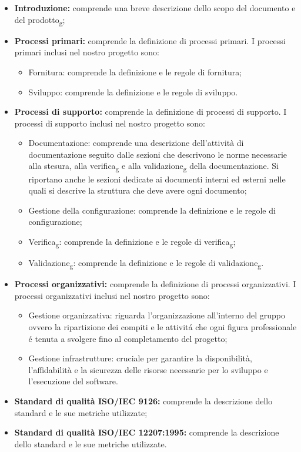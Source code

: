 \begin{itemize}
    \item \textbf{Introduzione:} comprende una breve descrizione dello scopo del documento e del prodotto\textsubscript{g};
    \item \textbf{Processi primari:} comprende la definizione di processi primari.
    I processi primari inclusi nel nostro progetto sono:
    \begin{itemize}
        \item Fornitura: comprende la definizione e le regole di fornitura;
        \item Sviluppo: comprende la definizione e le regole di sviluppo.
    \end{itemize}
    \item \textbf{Processi di supporto:} comprende la definizione di processi di supporto.
    I processi di supporto inclusi nel nostro progetto sono:
    \begin{itemize}
        \item Documentazione: comprende una descrizione dell'attività di documentazione seguito dalle sezioni che descrivono le norme necessarie alla stesura, alla verifica\textsubscript{g} e 
        alla validazione\textsubscript{g} della documentazione. Si riportano anche le sezioni dedicate ai documenti interni ed esterni nelle quali si descrive la struttura che deve avere ogni documento;
        \item Gestione della configurazione: comprende la definizione e le regole di configurazione; 
        \item Verifica\textsubscript{g}: comprende la definizione e le regole di verifica\textsubscript{g};
        \item Validazione\textsubscript{g}: comprende la definizione e le regole di validazione\textsubscript{g}.
    \end{itemize}
    \item \textbf{Processi organizzativi:} comprende la definizione di processi organizzativi.
    I processi organizzativi inclusi nel nostro progetto sono:
    \begin{itemize}
        \item Gestione organizzativa: riguarda l'organizzazione all'interno del gruppo ovvero la ripartizione dei compiti e le attivitá che ogni figura professionale é tenuta a svolgere fino al 
        completamento del progetto;
        \item Gestione infrastrutture: cruciale per garantire la disponibilità, l'affidabilità e la sicurezza delle risorse necessarie per lo sviluppo e l'esecuzione del software.
    \end{itemize}
    \item \textbf{Standard di qualità ISO/IEC 9126:} comprende la descrizione dello standard e le sue metriche utilizzate;
    \item \textbf{Standard di qualità ISO/IEC 12207:1995:} comprende la descrizione dello standard e le sue metriche utilizzate.
\end{itemize}

